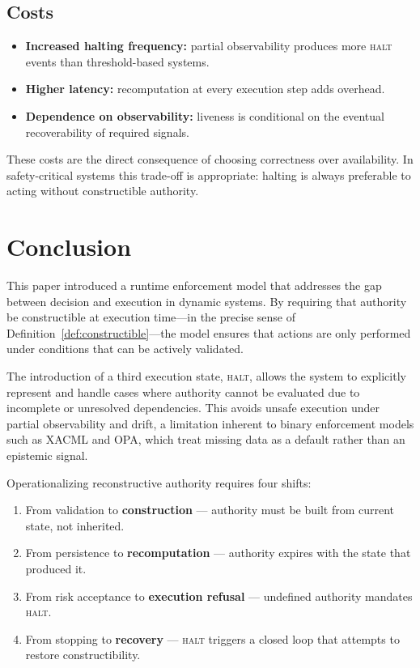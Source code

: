 \documentclass[11pt]{article}
\begin{document}
\subsection{Costs}

\begin{itemize}
  \item \textbf{Increased halting frequency:} partial observability produces more
        \textsc{halt} events than threshold-based systems.
  \item \textbf{Higher latency:} recomputation at every execution step adds overhead.
  \item \textbf{Dependence on observability:} liveness is conditional on the eventual
        recoverability of required signals.
\end{itemize}

These costs are the direct consequence of choosing correctness over availability. In
safety-critical systems this trade-off is appropriate: halting is always preferable to
acting without constructible authority.

\section{Conclusion}

This paper introduced a runtime enforcement model that addresses the gap between
decision and execution in dynamic systems. By requiring that authority be constructible
at execution time---in the precise sense of Definition~\ref{def:constructible}---the
model ensures that actions are only performed under conditions that can be actively
validated.

The introduction of a third execution state, \textsc{halt}, allows the system to
explicitly represent and handle cases where authority cannot be evaluated due to
incomplete or unresolved dependencies. This avoids unsafe execution under partial
observability and drift, a limitation inherent to binary enforcement models such as
XACML and OPA, which treat missing data as a default rather than an epistemic signal.

Operationalizing reconstructive authority requires four shifts:

\begin{enumerate}
  \item From validation to \textbf{construction} --- authority must be built from current
        state, not inherited.
  \item From persistence to \textbf{recomputation} --- authority expires with the state
        that produced it.
  \item From risk acceptance to \textbf{execution refusal} --- undefined authority
        mandates \textsc{halt}.
  \item From stopping to \textbf{recovery} --- \textsc{halt} triggers a closed loop that
        attempts to restore constructibility.
\end{enumerate}
\end{document}
